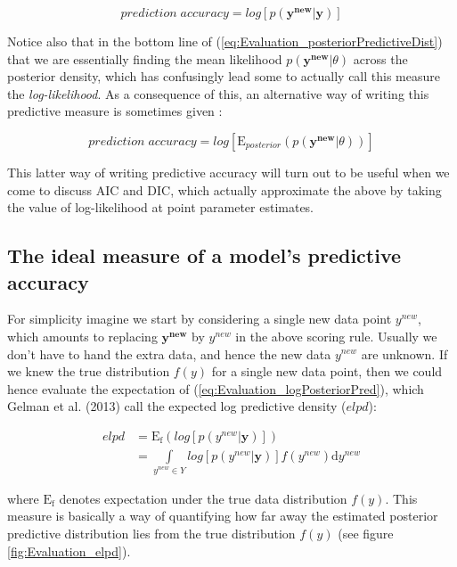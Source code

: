 \documentclass[11pt,fullpage]{book}
\begin{document}
\begin{equation}\label{eq:Evaluation_logPosteriorPred}
prediction\; accuracy = log\left[p(\boldsymbol{y^{new}}|\boldsymbol{y})\right]
\end{equation}

Notice also that in the bottom line of (\ref{eq:Evaluation_posteriorPredictiveDist}) that we are essentially finding the mean likelihood $p(\boldsymbol{y^{new}}|\theta)$ across the posterior density, which has confusingly lead some to actually call this measure the \textit{log-likelihood}. As a consequence of this, an alternative way of writing this predictive measure is sometimes given \cite{gelman2013bayesian}:

\begin{equation}\label{eq:Evaluation_logLikelihood}
prediction\; accuracy = log\left[\mathrm{E}_{posterior}(p(\boldsymbol{y^{new}}|\theta))\right]
\end{equation}

This latter way of writing predictive accuracy will turn out to be useful when we come to discuss AIC and DIC, which actually approximate the above by taking the value of log-likelihood at point parameter estimates.

\subsection{The ideal measure of a model's predictive accuracy}\label{sec:Evaluation_idealAccuracy}
For simplicity imagine we start by considering a single new data point $y^{new}$, which amounts to replacing $\boldsymbol{y^{new}}$ by $y^{new}$ in the above scoring rule. Usually we don't have to hand the extra data, and hence the new data $y^{new}$ are unknown. If we knew the true distribution $f(y)$ for a single new data point, then we could hence evaluate the expectation of (\ref{eq:Evaluation_logPosteriorPred}), which Gelman et al. (2013) call the expected log predictive density ($elpd$):

\begin{equation}\label{eq:Evaluation_elpd}
\begin{align}
elpd &= \mathrm{E_f}\left(log\left[p(y^{new}|\boldsymbol{y})\right]\right)\\
&= \int\limits_{y^{new}\in Y} log\left[p(y^{new}|\boldsymbol{y})\right] f(y^{new})\mathrm{d}y^{new}
\end{align}
\end{equation}

where $\mathrm{E_f}$ denotes expectation under the true data distribution $f(y)$. This measure is basically a way of quantifying how far away the estimated posterior predictive distribution lies from the true distribution $f(y)$ (see figure \ref{fig:Evaluation_elpd}).
\end{document}
